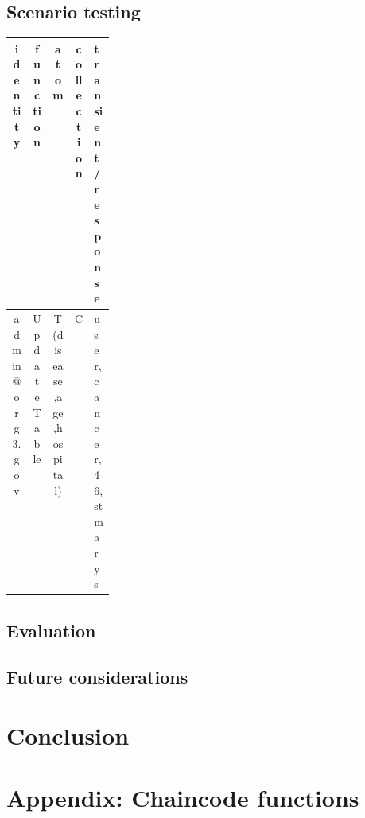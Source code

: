 \documentclass[12pt]{article}
\begin{document}
    \subsection{Scenario testing}
    \label{sec:scenario}
    
    
    \begin{table}[ht]
        \footnotesize
        \begin{tabular}{ c|c|c|c|p{0.15\linewidth} }
         identity & function & atom & collection & transient / response \\
         \hline
         admin@org3.gov & UpdateTable & T(disease,age,hospital) & C & user,cancer, 46,stmarys
        \end{tabular}
    \end{table}




    \subsection{Evaluation}

    \subsection{Future considerations}
    \label{sec:future}



    \section{Conclusion}


    
    
    \newpage
    
    


    \newpage
    \appendix
    \section{Appendix: Chaincode functions}
    \label{appendix:functions}
\end{document}
